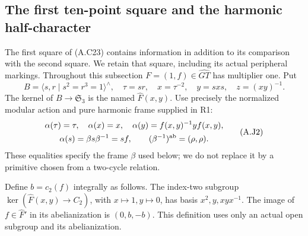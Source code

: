\subsection{The first ten-point square and the harmonic half-character}

The first square of (A.C23) contains information in addition to
its comparison with the second square.  We retain that square,
including its actual peripheral markings.  Throughout this
subsection $F=(1,f)\in\widehat{GT}$ has multiplier one.  Put
\[
 B=\langle s,r\mid s^2=r^3=1\rangle^{\wedge},\quad
 \tau=sr,\quad x=\tau^{-2},\quad y=sxs,\quad z=(xy)^{-1}.
 \tag{A.J1}
\]
The kernel of $B\to\mathfrak S_3$ is the named
$\widehat F(x,y)$.  Use precisely the normalized modular action
and pure harmonic frame supplied in R1:
\[
 \begin{gathered}
 \alpha(\tau)=\tau,\quad \alpha(x)=x,\quad
 \alpha(y)=f(x,y)^{-1}yf(x,y),\\
 \alpha(s)=\beta s\beta^{-1}=sf,
 \qquad (\beta^{-1})^{\rm ab}=(\rho,\rho).
 \end{gathered}
 \tag{A.J2}
\]
These equalities specify the frame $\beta$ used below; we do not
replace it by a primitive chosen from a two-cycle relation.

Define $b=c_2(f)$ integrally as follows.  The index-two subgroup
$\ker(\widehat F(x,y)\to C_2)$, with $x\mapsto1,y\mapsto0$,
has basis $x^2,y,xyx^{-1}$.  The image of $f\in\widehat F'$ in
its abelianization is $(0,b,-b)$.  This definition uses only an
actual open subgroup and its abelianization.

